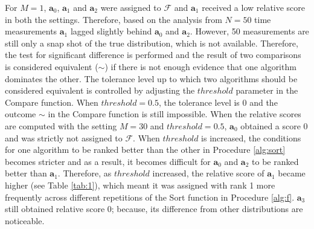\documentclass[conference]{IEEEtran}
\begin{document}
For $M=1$, $\mathbf{a}_0$, $\mathbf{a}_1$ and $\mathbf{a}_2$ were assigned to  $\mathcal{F}$ and $\mathbf{a}_1$ received a low relative score in both the settings. Therefore, based on the analysis from $N=50$ time measurements $\mathbf{a}_1$ lagged slightly behind $\mathbf{a}_0$ and $\mathbf{a}_2$. However, 50 measurements are still only a snap shot of the true distribution, which is not available. Therefore, the test for significant
difference is performed and the result of two comparisons is considered equivalent ($\sim$) if there is not enough evidence
that one algorithm dominates the other. The tolerance level up to which two algorithms should be considered equivalent
is controlled by adjusting the $threshold$ parameter in the Compare function. When $threshold=0.5$, the tolerance level is 0 and the outcome $\sim$ in the Compare function is still impossible. When the relative scores are computed with the setting  $M=30$ and $threshold=0.5$, $\mathbf{a}_0$ obtained a score 0 and was strictly not assigned to $\mathcal{F}$.  When $threshold$ is increased, the conditions for one algorithm to be ranked better than the other in Procedure \ref{alg:sort} becomes stricter and as a result, it becomes difficult for $\mathbf{a}_0$ and $\mathbf{a}_2$ to be ranked better than $\mathbf{a}_1$. Therefore, as $threshold$ increased, the relative score of $\mathbf{a}_1$ became higher (see Table \ref{tab:1}), which meant it was assigned with rank 1 more frequently across different repetitions of the  Sort function in Procedure \ref{alg:f}. $\mathbf{a}_3$ still obtained relative score 0; because, its difference from other distributions are noticeable.
\end{document}
